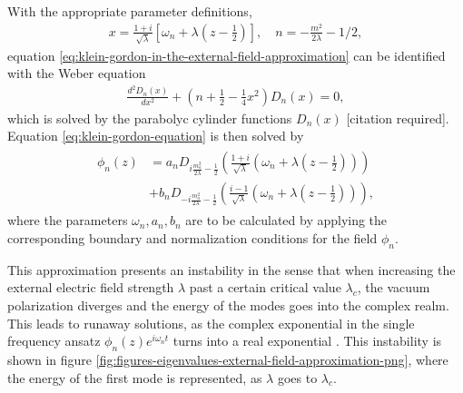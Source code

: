 		With the appropriate parameter definitions, 
		\begin{align}
			x = \frac{1+i}{\sqrt{\lambda} } \left[ \omega_n + \lambda \left(z - \frac{1}{2}\right) \right] , \,\,\,\,\,\, n = -\frac{m^2}{2\lambda} - 1/2,
		\end{align}
		equation \eqref{eq:klein-gordon-in-the-external-field-approximation}  can be identified with the Weber equation 
		\begin{align}
			 \frac{d^2 D_n(x)}{dx^2} + \left(n+ \frac{1}{2 }-\frac{1}{4}x^2\right) D_n(x) = 0,
			 \label{eq:Weber-equation}
		\end{align}
		which is solved by the parabolyc cylinder functions $D_n(x)$ [citation required].
		Equation \eqref{eq:klein-gordon-equation} is then solved by 
\begin{align}
	\begin{split}
	\phi_n(z) &= 
	a_n D_{i \frac{m_a^2}{2\lambda} - \frac{1}{2}} \left( 
		\frac{1+i}{\sqrt{\lambda} }
		\left( \omega_n + \lambda \left( z-\frac{1}{2} \right)
		\right) 
	\right)  \\
	&+
	b_n D_{-i \frac{m_a^2}{2\lambda} - \frac{1}{2}} \left( 
		\frac{i - 1}{\sqrt{\lambda} }
		\left( \omega_n + \lambda \left( z-\frac{1}{2} \right)
		\right) 
	\right),
	\end{split}
	\label{eq:parabolyc-cylinder}
\end{align}
where the parameters $\omega_n, a_n, b_n$ are to be calculated by applying the corresponding boundary and normalization conditions for the field $\phi_n$.


This approximation presents an instability in the sense that when increasing the external electric field strength $\lambda$ past a certain critical value $\lambda_c$, the vacuum polarization diverges and the energy of the modes goes into the complex realm. This leads to runaway solutions, as the complex exponential in the single frequency ansatz $\phi_n(z)e^{i \omega_n t }$ turns into a real exponential \cite{Ambjorn1983}. This instability is shown in figure \ref{fig:figures-eigenvalues-external-field-approximation-png}, where the energy of the first mode is represented, as $\lambda$ goes to $\lambda_c$. 

